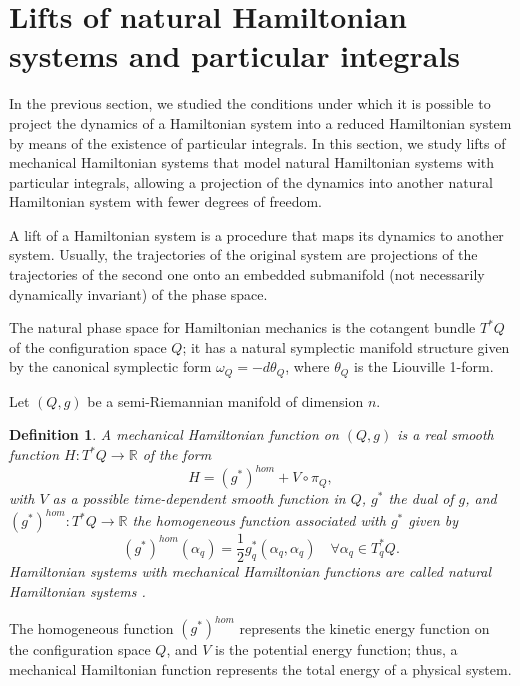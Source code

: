 \documentclass[10pt,a4paper]{article}
\newtheorem{definition}{Definition}
\begin{document}
\section{Lifts of natural Hamiltonian systems and particular integrals}

In the previous section, we studied the conditions under which it is possible to project the dynamics of a Hamiltonian system into a reduced Hamiltonian system by means of the existence of particular integrals. In this section, we study lifts of mechanical Hamiltonian systems that model natural Hamiltonian systems with particular integrals, allowing a projection of the dynamics into another natural Hamiltonian system with fewer degrees of freedom.

A lift of a Hamiltonian system is a procedure that maps its dynamics to another system. Usually, the trajectories of the original system are projections of the trajectories of the second one onto an embedded submanifold (not necessarily dynamically invariant) of the phase space. 

The natural phase space for Hamiltonian mechanics is the cotangent bundle $T^{*}Q$ of the configuration space $Q$; it has a natural symplectic manifold structure given by the canonical symplectic form $\omega_{Q}=-d\theta_{Q}$, where $\theta_{Q}$ is the Liouville 1-form\cite{AMRC2008}. 

Let $(Q,g)$ be a semi-Riemannian manifold of dimension $n$.

\begin{definition}\cite{godbillon1969geometrie,AMRC2008,iglesias2023mechanical}
A mechanical Hamiltonian function on $(Q,g)$ is a real smooth function $H:T^{*}Q\longrightarrow \mathbb{R}$ of the form
\begin{equation*}
H=(g^{*})^{hom}+V\circ \pi_{Q},
\end{equation*}
with $V$ as a possible time-dependent smooth function in $Q$, $g^{*}$ the dual of $g$, and $(g^{*})^{hom}:T^{*}Q\longrightarrow \mathbb{R}$ the homogeneous function associated with $g^{*}$ given by $$(g^{*})^{hom}(\alpha_{q})=\frac{1}{2}g^{*}_{q}(\alpha_{q},\alpha_{q})\quad \forall \alpha_{q}\in T_{q}^{*}Q.$$ 
Hamiltonian systems with mechanical Hamiltonian functions are called natural Hamiltonian systems \cite{Arnold78}.
\end{definition}
The homogeneous function $(g^{*})^{hom}$ represents the kinetic energy function on the configuration space $Q$, and $V$ is the potential energy function; thus, a mechanical Hamiltonian function represents the total energy of a physical system.
\end{document}
